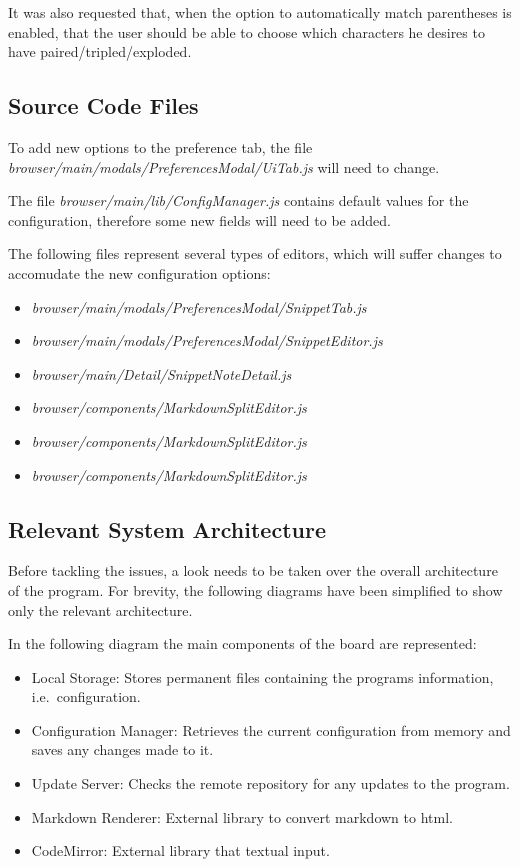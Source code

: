 It was also requested that, when the option to automatically match
parentheses is enabled, that the user should be able to choose which
characters he desires to have paired/tripled/exploded.

\subsection{Source Code Files}\label{source-code-files}

To add new options to the preference tab, the file
\emph{browser/main/modals/PreferencesModal/UiTab.js} will need to
change.

The file \emph{browser/main/lib/ConfigManager.js} contains default
values for the configuration, therefore some new fields will need to be
added.

The following files represent several types of editors, which will
suffer changes to accomudate the new configuration options:

\begin{itemize}
\tightlist
\item
  \emph{browser/main/modals/PreferencesModal/SnippetTab.js}
\item
  \emph{browser/main/modals/PreferencesModal/SnippetEditor.js}
\item
  \emph{browser/main/Detail/SnippetNoteDetail.js}
\item
  \emph{browser/components/MarkdownSplitEditor.js}
\item
  \emph{browser/components/MarkdownSplitEditor.js}
\item
  \emph{browser/components/MarkdownSplitEditor.js}
\end{itemize}

\subsection{Relevant System
Architecture}\label{relevant-system-architecture}

Before tackling the issues, a look needs to be taken over the overall
architecture of the program. For brevity, the following diagrams have
been simplified to show only the relevant architecture.

In the following diagram the main components of the board are
represented:

\begin{itemize}
\item
  Local Storage: Stores permanent files containing the programs
  information, i.e.~configuration.
\item
  Configuration Manager: Retrieves the current configuration from memory
  and saves any changes made to it.
\item
  Update Server: Checks the remote repository for any updates to the
  program.
\item
  Markdown Renderer: External library to convert markdown to html.
\item
  CodeMirror: External library that textual input.
\end{itemize}

